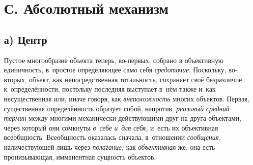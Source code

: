 \section[С. Абсолютный механизм]{С. Абсолютный механизм}

\subsection[а) Центр]{а) Центр}

Пустое многообразие объекта теперь, во-первых, собрано в
объективную единичность, в~простое определяющее само себя
{\em средоточие}.
Поскольку, во-вторых, объект, как непосредственная
тотальность, сохраняет своё безразличие к~определённости, постольку
последняя выступает в~нём также и~как несущественная или, иначе говоря, как
{\em внеположность}
многих объектов. Первая, существенная определённость образует
собой, напротив, {\em реальный средний
термин} между многими механически действующими друг на друга
объектами, через который они сомкнуты
{\em в~себе и~для себя,}
и~есть их объективная всеобщность. Всеобщность оказалась
сначала, в~отношении {\em сообщения,}
наличествующей лишь через
{\em полагание;} как
{\em объективная} же, она
есть пронизывающая, имманентная сущность объектов.

